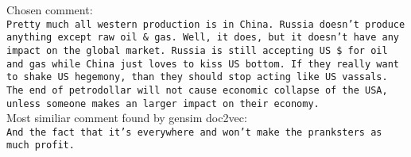 \documentclass{scrartcl}
\begin{document}
Chosen comment:\\

\texttt{Pretty much all western production is in China. Russia doesn't produce anything except raw oil \& gas. Well, it does, but it doesn't have any impact on the global market. Russia is still accepting US \$ for oil and gas while China just loves to kiss US bottom. If they really want to shake US hegemony, than they should stop acting like US vassals. The end of petrodollar will not cause economic collapse of the USA, unless someone makes an larger impact on their economy.}\\

Most similiar comment found by gensim doc2vec:\\

\texttt{And the fact that it's everywhere and won't make the pranksters as much profit.}
\end{document}

